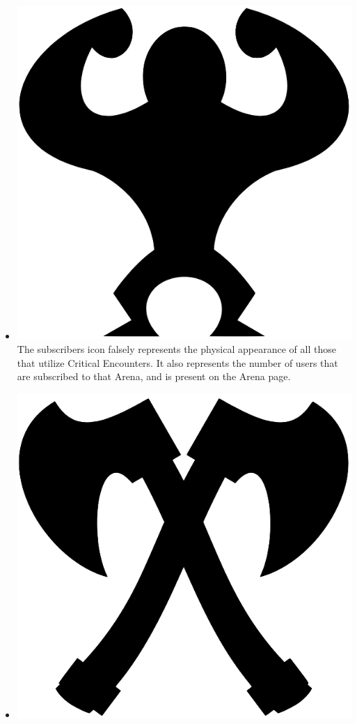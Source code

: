 \documentclass[12pt,a4paper]{report}
\begin{document}
\begin{itemize}
		\item \includegraphics[scale=.03]{subscribers_icon}
		The subscribers icon falsely represents the physical appearance of all those that utilize Critical Encounters. It also represents the number of users that are subscribed to that Arena, and is present on the Arena page.
		\item \includegraphics[scale=.03]{plays_icon}

\end{itemize}
\end{document}

